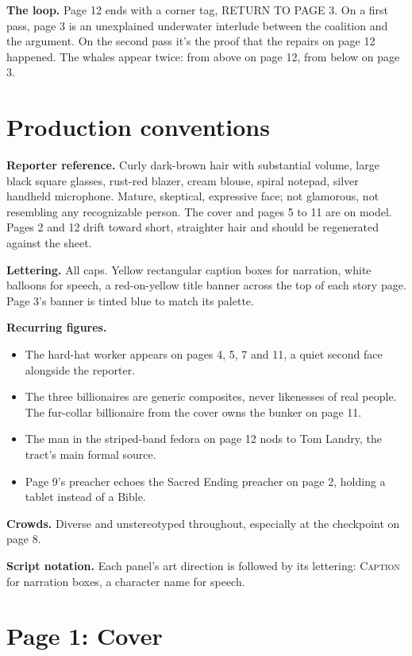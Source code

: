 \documentclass[11pt]{article}
\begin{document}
\textbf{The loop.} Page 12 ends with a corner tag, \textsf{RETURN TO PAGE 3}. On a first pass, page 3 is an unexplained underwater interlude between the coalition and the argument. On the second pass it's the proof that the repairs on page 12 happened. The whales appear twice: from above on page 12, from below on page 3.

\section{Production conventions}

\textbf{Reporter reference.} Curly dark-brown hair with substantial volume, large black square glasses, rust-red blazer, cream blouse, spiral notepad, silver handheld microphone. Mature, skeptical, expressive face; not glamorous, not resembling any recognizable person. The cover and pages 5 to 11 are on model. Pages 2 and 12 drift toward short, straighter hair and should be regenerated against the sheet.

\textbf{Lettering.} All caps. Yellow rectangular caption boxes for narration, white balloons for speech, a red-on-yellow title banner across the top of each story page. Page 3's banner is tinted blue to match its palette.

\textbf{Recurring figures.}
\begin{itemize}
\item The hard-hat worker appears on pages 4, 5, 7 and 11, a quiet second face alongside the reporter.
\item The three billionaires are generic composites, never likenesses of real people. The fur-collar billionaire from the cover owns the bunker on page 11.
\item The man in the striped-band fedora on page 12 nods to Tom Landry, the tract's main formal source.
\item Page 9's preacher echoes the Sacred Ending preacher on page 2, holding a tablet instead of a Bible.
\end{itemize}

\textbf{Crowds.} Diverse and unstereotyped throughout, especially at the checkpoint on page 8.

\textbf{Script notation.} Each panel's art direction is followed by its lettering: \textsc{Caption} for narration boxes, a character name for speech.

\section{Page 1: Cover}
\end{document}
